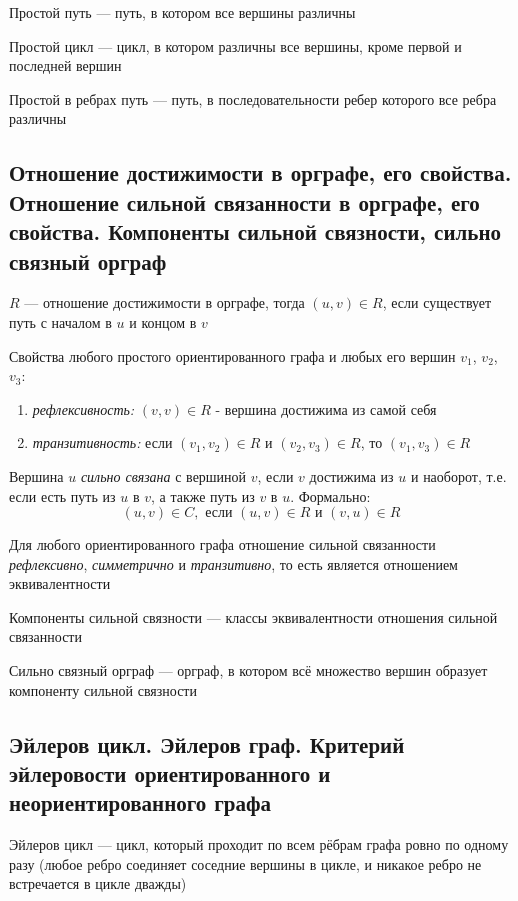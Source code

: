 \documentclass[a4paper]{article}
\begin{document}
 Простой путь — путь, в котором все вершины различны

 Простой цикл — цикл, в котором различны все вершины, кроме первой и последней вершин

 Простой в ребрах путь — путь, в последовательности ребер которого все ребра различны



\subsection{Отношение достижимости в орграфе, его свойства. Отношение сильной связанности в орграфе, его свойства. Компоненты сильной связности, сильно связный орграф}
 $R$ — отношение достижимости в орграфе, тогда $(u,v)\in R$, если существует путь с началом в $u$ и концом в $v$

Свойства любого простого ориентированного графа и любых его вершин $v_1$, $v_2$, $v_3$:
\begin{enumerate}
    \item \textit{рефлексивность:} $(v,v)\in R$ - вершина достижима из самой себя
    \item \textit{транзитивность:} если $(v_1,v_2)\in R$ и $(v_2,v_3)\in R$, то $(v_1,v_3)\in R$
\end{enumerate}

 Вершина $u$ \textit{сильно связана} с вершиной $v$, если $v$ достижима из $u$ и наоборот, т.е. если есть путь из $u$ в $v$, а также путь из $v$ в $u$. Формально: 
\begin{equation*}
    (u,v)\in C,\text{ если }(u,v)\in R\text{ и }(v,u)\in R
\end{equation*}

\comment Для любого ориентированного графа отношение сильной связанности \textit{рефлексивно}, \textit{симметрично} и \textit{транзитивно}, то есть является отношением эквивалентности

 Компоненты сильной связности — классы эквивалентности отношения сильной связанности

 Сильно связный орграф — орграф, в котором всё множество вершин образует компоненту сильной связности


\subsection{Эйлеров цикл. Эйлеров граф. Критерий эйлеровости ориентированного и неориентированного графа}
 Эйлеров цикл — цикл, который проходит по всем рёбрам графа ровно по одному разу (любое ребро соединяет соседние вершины в цикле, и никакое ребро не встречается в цикле дважды)
\end{document}
